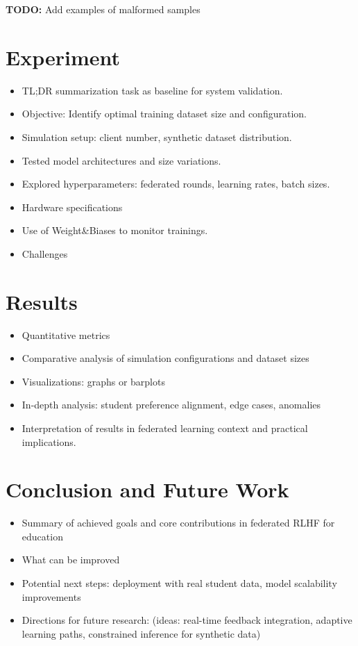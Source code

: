 \documentclass[sigconf]{acmart}
\begin{document}
\textbf{TODO:} Add examples of malformed samples

\section{Experiment}
\begin{itemize}
    \item TL;DR summarization task as baseline for system validation.
    \item Objective: Identify optimal training dataset size and configuration.
    \item Simulation setup: client number, synthetic dataset distribution.
    \item Tested model architectures and size variations.
    \item Explored hyperparameters: federated rounds, learning rates, batch sizes.
    \item Hardware specifications
    \item Use of Weight\&Biases to monitor trainings.
 	\item Challenges
\end{itemize}


\section{Results}
\begin{itemize}
    \item Quantitative metrics
    \item Comparative analysis of simulation configurations and dataset sizes
    \item Visualizations: graphs or barplots
    \item In-depth analysis: student preference alignment, edge cases, anomalies
    \item Interpretation of results in federated learning context and practical implications.
\end{itemize}

\section{Conclusion and Future Work}
\begin{itemize}
    \item Summary of achieved goals and core contributions in federated RLHF for education
    \item What can be improved
    \item Potential next steps: deployment with real student data, model scalability improvements
    \item Directions for future research: (ideas: real-time feedback integration, adaptive learning paths, constrained inference for synthetic data)
\end{itemize}
\end{document}
